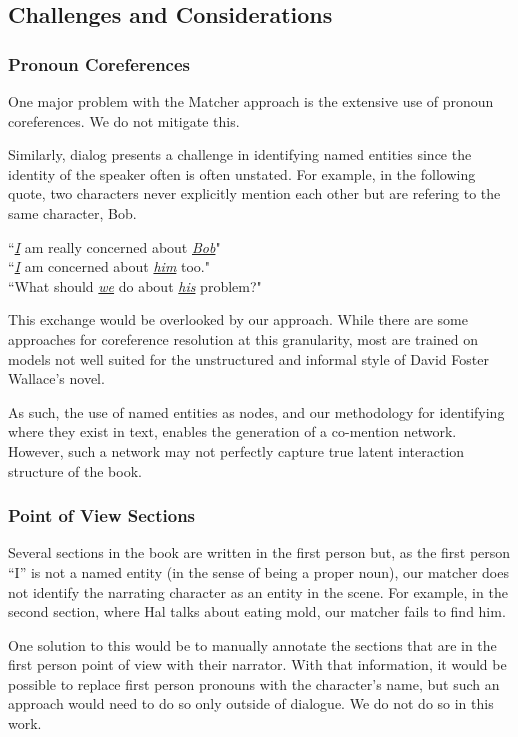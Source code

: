 \subsection{Challenges and Considerations}

\subsubsection{Pronoun Coreferences}
One major problem with the Matcher approach is the extensive use of pronoun coreferences. We do not mitigate this.

Similarly, dialog presents a challenge in identifying named entities since the identity of the speaker often is often unstated. For example, in the following quote, two characters never explicitly mention each other but are refering to the same character, Bob.

\begin{displayquote}
``\emph{\underline{I}} am really concerned about \emph{\underline{Bob}}"\\
``\emph{\underline{I}} am concerned about \emph{\underline{him}} too."\\
``What should \underline{\emph{we}} do about \underline{\emph{his}} problem?"
\end{displayquote}

This exchange would be overlooked by our approach. While there are some approaches for coreference resolution at this granularity, most are trained on models not well suited for the unstructured and informal style of David Foster Wallace's novel. 

As such, the use of named entities as nodes, and our methodology for identifying where they exist in text, enables the generation of a co-mention network. However, such a network may not perfectly capture true latent interaction structure of the book.

\subsubsection{Point of View Sections}
Several sections in the book are written in the first person but, as the first person ``I'' is not a named entity (in the sense of being a proper noun), our matcher does not identify the narrating character as an entity in the scene. For example, in the second section, where Hal talks about eating mold, our matcher fails to find him.

One solution to this would be to manually annotate the sections that are in the first person point of view with their narrator. With that information, it would be possible to replace first person pronouns with the character's name, but such an approach would need to do so only outside of dialogue. We do not do so in this work.

